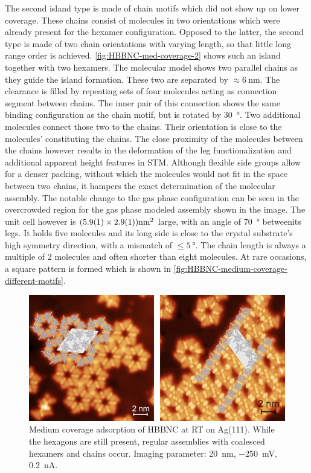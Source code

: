 The second island type is made of chain motifs which did not show up on lower coverage. These chains consist of molecules in two orientations which were already present for the hexamer configuration. Opposed to the latter, the second type is made of two chain orientations with varying length, so that little long range order is achieved. \autoref{fig:HBBNC-med-coverage-2} shows such an island together with two hexamers. The molecular model shows two parallel chains as they guide the island formation. These two are separated by $\approx \SI{6}{\nano \meter}$. The clearance is filled by repeating sets of four molecules acting as connection segment between chains. The inner pair of this connection shows the same binding configuration as the chain motif, but is rotated by \SI{30}{\degree}. Two additional molecules connect those two to the chains. Their orientation is close to the molecules' constituting the chains. The close proximity of the molecules between the chains however results in the deformation of the leg functionalization and additional apparent height features in STM. Although flexible side groups allow for a denser packing, without which the molecules would not fit in the space between two chains, it hampers the exact determination of the molecular assembly. The notable change to the gas phase configuration can be seen in the overcrowded region for the gas phase modeled assembly shown in the image. The unit cell however is $(\SI{5.9 \pm 0.1}{} \times \SI{2.9 \pm 0.1}{})\SI{}{\nano \meter \squared}$ large, with an angle of \SI{70}{\degree} betweenits legs. It holds five molecules and its long side is close to the crystal substrate's high symmetry direction, with a mismatch of $\leq \SI{5}{\degree}$. The chain length is always a multiple of 2 molecules and often shorter than eight molecules.  At rare occasions, a square pattern is formed which is shown in \autoref{fig:HBBNC-medium-coverage-different-motifs}.

\begin{figure}[] \centering
	\includegraphics[width=\textwidth]{./images/hbbnc-ag-111-rt-med-coverage-2}
	\caption{Medium coverage adsorption of HBBNC at RT on Ag(111). While the hexagons are still present, regular assemblies with coalesced hexamers and chains occur. Imaging parameter: \SI{20}{\nano \meter}, \SI{-250}{\milli \volt}, \SI{0.2}{\nano \ampere}.}
	\label{fig:HBBNC-med-coverage-2}
\end{figure}

